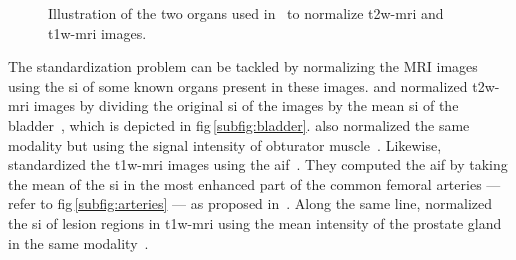 \begin{figure}
\centering
	\hspace*{\fill}
	 \hfill
	\hspace*{\fill}
	\caption{Illustration of the two organs used in~\cite{Niaf2011,Niaf2012} to normalize \acs*{t2w}-\acs*{mri} and \ac{t1w}-\acs*{mri} images.}
	\label{fig:niaf}
\end{figure}

The standardization problem can be tackled by normalizing the MRI images using the \ac{si} of some known organs present in these images. 
\citeauthor{Niaf2012} and \citeauthor{lehaire2014computer} normalized \ac{t2w}-\ac{mri} images by dividing the original \ac{si} of the images by the mean \ac{si} of the bladder~\cite{Niaf2011,Niaf2012,lehaire2014computer}, which is depicted in \acs{fig}\,\ref{subfig:bladder}.
\citeauthor{giannini2015fully} also normalized the same modality but using the signal intensity of obturator muscle~\cite{giannini2015fully}.
Likewise, \citeauthor{Niaf2011} standardized the \ac{t1w}-\ac{mri} images using the \ac{aif}~\cite{Niaf2011}.
They computed the \ac{aif} by taking the mean of the \ac{si} in the most enhanced part of the common femoral arteries --- refer to \acs{fig}\,\ref{subfig:arteries} --- as proposed in~\cite{Wiart2007}.
Along the same line, \citeauthor{samarasinghe2016semi} normalized the \ac{si} of lesion regions in \ac{t1w}-\ac{mri} using the mean intensity of the prostate gland in the same modality~\cite{samarasinghe2016semi}.


